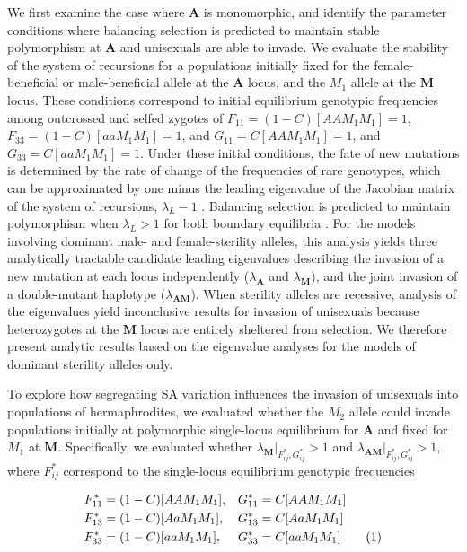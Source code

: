 \documentclass[9pt,twocolumn,twoside,lineno]{gsajnl}
\newcommand\numberthis{\addtocounter{equation}{1}\tag{\theequation}}
\begin{document}
We first examine the case where $\mathbf{A}$ is monomorphic, and identify the parameter conditions where balancing selection is predicted to maintain stable polymorphism at $\mathbf{A}$ and unisexuals are able to invade. We evaluate the stability of the system of recursions for a populations initially fixed for the female-beneficial or male-beneficial allele at the $\mathbf{A}$ locus, and the $M_1$ allele at the $\mathbf{M}$ locus. These conditions correspond to initial equilibrium genotypic frequencies among outcrossed and selfed zygotes of $F_{11} = (1 - C) [AAM_1M_1] = 1$, $F_{33} = (1 - C) [aaM_1M_1] = 1$, and $G_{11} = C [AAM_1M_1] = 1$, and $G_{33} = C [aaM_1M_1] = 1$. Under these initial conditions, the fate of new mutations is determined by the rate of change of the frequencies of rare genotypes, which can be approximated by one minus the leading eigenvalue of the Jacobian matrix of the system of recursions, $\lambda_L - 1$ \citep{OttoDay2007}. Balancing selection is predicted to maintain polymorphism when $\lambda_L > 1$ for both boundary equilibria \citep{Prout1968,OttoDay2007}. For the models involving dominant male- and female-sterility alleles, this analysis yields three analytically tractable candidate leading eigenvalues describing the invasion of a new mutation at each locus independently ($\lambda_\mathbf{A}$ and $\lambda_\mathbf{M}$), and the joint invasion of a double-mutant haplotype ($\lambda_\mathbf{AM}$). When sterility alleles are recessive, analysis of the eigenvalues yield inconclusive results for invasion of unisexuals because heterozygotes at the $\mathbf{M}$ locus are entirely sheltered from selection. We therefore present analytic results based on the eigenvalue analyses for the models of dominant sterility alleles only.

To explore how segregating SA variation influences the invasion of unisexuals into populations of hermaphrodites, we evaluated whether the $M_2$ allele could invade populations initially at polymorphic single-locus equilibrium for $\mathbf{A}$ and fixed for $M_1$ at $\mathbf{M}$. Specifically, we evaluated whether $\lambda_\mathbf{M} \rvert_{F^{\ast}_{ij},G^{\ast}_{ij}} > 1$ and $\lambda_\mathbf{AM} \rvert_{F^{\ast}_{ij},G^{\ast}_{ij}} > 1$, where $F^{\ast}_{ij}$ correspond to the single-locus equilibrium genotypic frequencies
\begin{linenomath}\begin{align*} \label{eq:SA1locEQ}
	F^{\ast}_{11} &= (1 - C)[AAM_1M_1],& G^{\ast}_{11} &= C[AAM_1M_1]  \\
	F^{\ast}_{13} &= (1 - C)[AaM_1M_1],& G^{\ast}_{13} &= C[AaM_1M_1] \\
	F^{\ast}_{33} &= (1 - C)[aaM_1M_1],& G^{\ast}_{33} &= C[aaM_1M_1] \numberthis \\
\end{align*}\end{linenomath}
\end{document}
